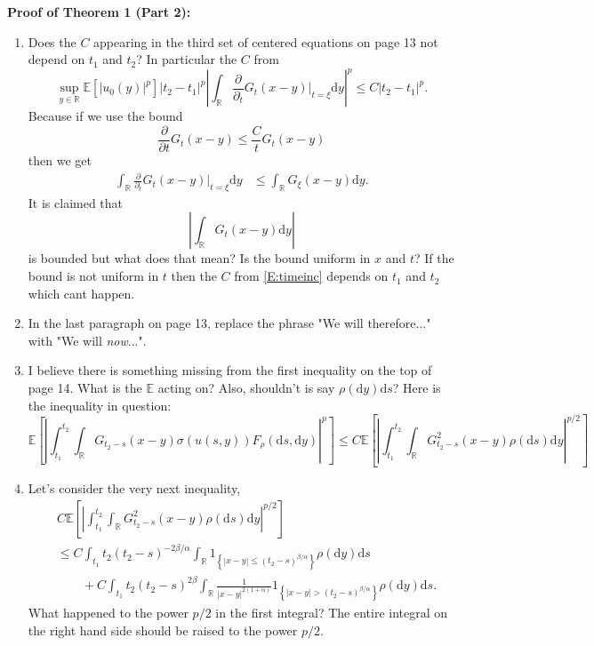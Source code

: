 \documentclass[a4paper,11pt]{article}
\numberwithin{equation}{section}
\numberwithin{equation}{section}
\theoremstyle{plain}
\theoremstyle{definition}
\newcommand{\ud}{\ensuremath{\mathrm{d} }}
\newcommand{\R}{\mathbb{R}}
\begin{document}
\textbf{Proof of Theorem 1 (Part 2):}
\begin{enumerate}
	\item
Does the $C$ appearing in the third set of centered equations on page 13 not depend on $t_1$ and $t_2$? In particular the $C$ from 
	\begin{equation}\label{E:timeinc}
		\sup_{y\in\R} \mathbb{E}\left[|u_0(y)|^p\right]|t_2-t_1|^p \left| \int_{\R} \frac{\partial}{\partial_t} G_t(x-y) \vert_{t=\xi} \ud y \right|^p \le C|t_2-t_1|^p.
	\end{equation} 
Because if we use the bound 
	\[
		\frac{\partial}{\partial t}G_t(x-y) \le \frac{C}{t}G_t(x-y)
	\]
then we get
	\begin{align*}
		\int_{\R} \frac{\partial}{\partial_t} G_t(x-y) \vert_{t=\xi} \ud y  &\le \int_{\R}  G_\xi(x-y) \ud y.
	\end{align*}
It is claimed that 
	\[
	\left|\int_{\R}  G_t(x-y) \ud y \right|
	\]
is bounded but what does that mean? Is the bound uniform in $x$ and $t$? If the bound is not uniform in $t$ then the $C$ from \eqref{E:timeinc} depends on $t_1$ and $t_2$ which cant happen. 

	\item
In the last paragraph on page 13, replace the phrase "We will therefore..." with "We will \textit{now}...".

	\item
I believe there is something missing from the first inequality on the top of page 14. What is the $\mathbb{E}$ acting on? Also, shouldn't is say $\rho(\ud y) \ud s$? Here is the inequality in question:
	\[
		\mathbb{E}\left[ \left| \int_{t_1}^{t_2} \int_{\R} G_{t_2-s}(x-y)\sigma(u(s,y))F_{\rho}(\ud s, \ud y) \right|^p \right] \le C \mathbb{E} \left[ \left| \int_{t_1}^{t_2} \int_{\R} G^2_{t_2-s}(x-y)\rho(\ud s) \ud y \right|^{p/2} \right]
	\]
	
	\item 
Let's consider the very next inequality,
	\begin{align*}
		&C \mathbb{E} \left[ \left| \int_{t_1}^{t_2} \int_{\R} G^2_{t_2-s}(x-y)\rho(\ud s) \ud y \right|^{p/2} \right] 
	\\ & \le C \int_{t_1}{t_2} (t_2 - s)^{-2\beta/\alpha} \int_{\R}1_{\left\{ |x-y| \le (t_2-s)^{\beta / \alpha} \right\}}\rho(\ud y) \ud s 
	\\ & \quad \quad + C \int_{t_1}{t_2} (t_2-s)^{2\beta} \int_{\R} \frac{1}{|x-y|^{2(1+\alpha)}}1_{\left\{ |x-y| > (t_2-s)^{\beta / \alpha} \right\}} \rho(\ud y) \ud s.
	\end{align*}
What happened to the power $p/2$ in the first integral? The entire integral on the right hand side should be raised to the power $p/2$.


\end{enumerate}
\end{document}
